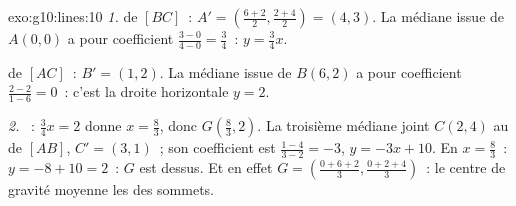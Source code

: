 \begin{solution}{exo:g10:lines:10}
\emph{1.}  de $[BC]$~: $A' = \left(\frac{6+2}{2},
\frac{2+4}{2}\right) = (4, 3)$. La médiane issue de $A(0,0)$ a pour
coefficient $\frac{3 - 0}{4 - 0} = \frac34$~: 
$y = \frac34 x$.

 de $[AC]$~: $B' = (1, 2)$. La médiane issue de $B(6, 2)$ a pour
coefficient $\frac{2 - 2}{1 - 6} = 0$~: c'est la droite horizontale
$y = 2$.

\emph{2.} ~: $\frac34 x = 2$ donne $x = \frac83$, donc
$G\left(\frac83, 2\right)$. La troisième médiane joint $C(2,4)$ au
 de $[AB]$, $C' = (3, 1)$~; son coefficient est
$\frac{1 - 4}{3 - 2} = -3$,  $y = -3x + 10$. En $x = \frac83$~:
$y = -8 + 10 = 2$~: $G$ est dessus. Et en effet
$G = \left(\frac{0 + 6 + 2}{3}, \frac{0 + 2 + 4}{3}\right)$~: le
centre de gravité moyenne les  des sommets.
\end{solution}

